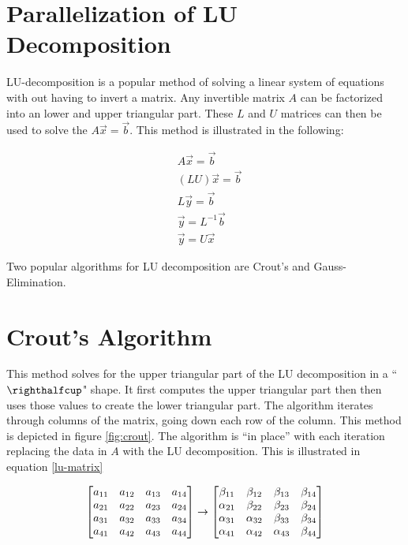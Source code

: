 \documentclass[12pt,letterpaper]{article}
\begin{document}

\section*{Parallelization of LU Decomposition} %

LU-decomposition is a popular method of solving a linear system of equations with out having to invert a matrix. Any invertible matrix \(A\) can be factorized into an lower and upper triangular part. These \(L\) and \(U\) matrices can then be used to solve the \(A\vec{x} = \vec{b} \). This method is illustrated in the following:

\begin{align}
		&A\vec{x} = \vec{b} \\
	&(LU)\vec{x} = \vec{b} \\
	&L\vec{y} = \vec{b} \\
	&\vec{y} = L^{-1}\vec{b} \\
	&\vec{y} = U\vec{x}
\end{align}

Two popular algorithms for LU decomposition are Crout's and Gauss-Elimination.

\section{Crout's Algorithm}
   This method solves for the upper triangular part of the LU decomposition in a ``$\righthalfcup$" shape. It first computes the upper triangular part then then uses those values to create the lower triangular part. The algorithm iterates through columns of the matrix, going down each row of the column. This method is depicted in figure \ref{fig:crout}. The algorithm is ``in place'' with each iteration replacing the data in \(A\) with the LU decomposition. This is illustrated in equation \ref{lu-matrix}

   \begin{align}\label{lu-matrix}
   	\mqty[\xmat*{a}{4}{4}] \rightarrow  \mqty[\beta_{11} & \beta_{12} & \beta_{13} & \beta_{14} \\
   	\alpha_{21} & \beta_{22} & \beta_{23} & \beta_{24} \\
   	\alpha_{31} & \alpha_{32} & \beta_{33} & \beta_{34} \\
   	\alpha_{41} & \alpha_{42} & \alpha_{43} & \beta_{44} \\]
   \end{align}
\end{document}
